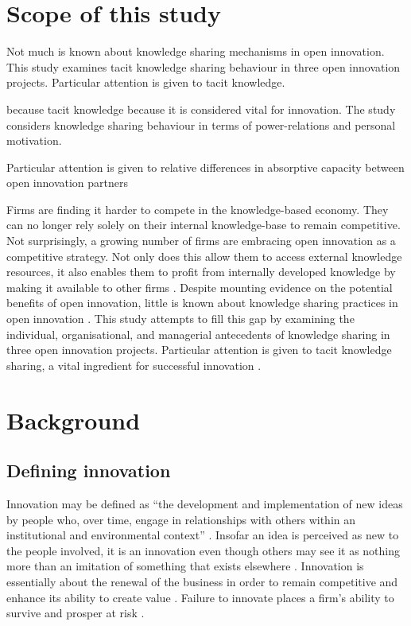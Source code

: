 
\section{Scope of this study}

Not much is known about knowledge sharing mechanisms in open innovation. This study examines tacit knowledge sharing behaviour in three open innovation projects. Particular attention is given to tacit knowledge. 


 because tacit knowledge  because it is considered vital for innovation. The study considers knowledge sharing behaviour in terms of power-relations and personal motivation. 



Particular attention is given to relative differences in absorptive capacity between open innovation partners 

Firms are finding it harder to compete in the knowledge-based economy. They can no longer rely solely on their internal knowledge-base to remain competitive. Not surprisingly, a growing number of firms are embracing open innovation as a competitive strategy. Not only does this allow them to access external knowledge resources, it also enables them to profit from internally developed knowledge by making it available to other firms \citep{laursen2006open,chesbrough2013managing,stanko2017under}. Despite mounting evidence on the potential benefits of open innovation, little is known about knowledge sharing practices in open innovation \citep{lakemond2016match}. This study attempts to fill this gap by examining the individual, organisational, and managerial antecedents of knowledge sharing in three open innovation projects. Particular attention is given to tacit knowledge sharing, a vital ingredient for successful innovation \citep{leonard1998role,koskinen2002role,cavusgil2003tacit,seidler2008use,leonard2014knowledge}.

\section{Background}

\subsection{Defining innovation}

Innovation may be defined as \enquote{the development and implementation of new ideas by people who, over time, engage in relationships with others within an institutional and environmental context} \citep[][pg.]{van1986central}. Insofar an idea is perceived as new to the people involved, it is an innovation even though others may see it as nothing more than an imitation of something that exists elsewhere \citep{van1986central}. Innovation is essentially about the renewal of the business in order to remain competitive and enhance its ability to create value \citep{schumpeter1950capitalism}. Failure to innovate places a firm's ability to survive and prosper at risk \citep{bessant2005managing}.


